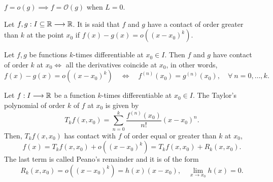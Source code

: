\begin{remark}
    $f = o\left( g \right) \implies f = \mathcal{O}\left( g \right) $ when $L = 0$.
\end{remark}


\begin{defi}
    Let $f, g : I\subseteq\mathbb{R}\longrightarrow \mathbb{R}$. It is said that $f$ and $g$ have a contact of order greater than $k$
    at the point $x_0$ if $f\left( x \right) - g\left( x \right) = o\left( \left( x - x_0 \right)^k \right) $.
\end{defi}

\begin{theorem}
    Let $f, g$ be functions $k$-times differentiable at $x_0\in I$. Then $f$ and $g$ have contact of order $k$
    at $x_0 \iff$ all the derivatives coincide at $x_0$, in other words,
    \begin{equation}
        f\left( x \right) - g\left( x \right) = o\left( \left( x - x_0 \right)^k \right)\quad \iff\quad
        f^\left( n \right) \left( x_0 \right) = g^\left( n \right) \left( x_0 \right),\quad \forall\ n = 0, \ldots, k.
    \end{equation}
\end{theorem}

\begin{theorem}
    Let $f : I\longrightarrow \mathbb{R}$ be a function $k$-times differentiable at $x_0\in I$. The Taylor's polynomial of
    order $k$ of $f$ at $x_0$ is given by
    \begin{equation}
        T_kf\left( x, x_0 \right) = \sum_{n=0}^k\frac{f^{\left( n \right) }\left( x_0 \right) }{n!}\left( x - x_0 \right)^n.
    \end{equation}
    Then, $T_kf\left( x, x_0 \right) $ has contact with $f$ of order equal or greater than $k$ at $x_0$,
    \begin{equation}
        f\left( x \right) = T_kf\left( x, x_0 \right) + o\left( \left( x - x_0 \right) ^k \right) = T_kf\left( x, x_0 \right) + R_k\left( x, x_0 \right).
    \end{equation}
    The last term is called Peano's remainder and it is of the form
    \begin{equation}
        R_k\left( x, x_0 \right) = o\left( \left( x - x_0 \right) ^k \right) = h\left( x \right)\left( x - x_0 \right), \quad \lim_{x\to x_0}h\left( x \right) = 0.
    \end{equation}
\end{theorem}
